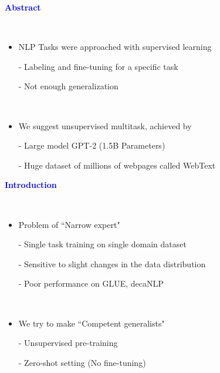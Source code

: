 \documentclass[professionalfont]{beamer}
\begin{document}
\frame{\titlepage}

\begin{frame}
\begin{center}
    { \textbf{\textcolor{blue}{ {\fontsize{12}{14}\selectfont Abstract} }} }
\end{center}
\\[0.5cm]

{\fontsize{10}{14}\selectfont 
\begin{itemize}
    \item NLP Tasks were approached with supervised learning
    
    - Labeling and fine-tuning for a specific task
    
    - Not enough generalization

    \\[0.5cm]

    \item We suggest unsupervised multitask, achieved by

    - Large model GPT-2 (1.5B Parameters)

    - Huge dataset of millions of webpages called WebText
\end{itemize}
}

\end{frame}

\begin{frame}
\begin{center}
    { \textbf{\textcolor{blue}{ {\fontsize{12}{14}\selectfont Introduction} }} }
\end{center}
\\[0.5cm]

{\fontsize{10}{14}\selectfont 
\begin{itemize}
    \item Problem of ``Narrow expert"
    
    - Single task training on single domain dataset
    
    - Sensitive to slight changes in the data distribution

    - Poor performance on GLUE, decaNLP

    \\[0.5cm]

    \item We try to make ``Competent generalists"

    - Unsupervised pre-training

    - Zero-shot setting (No fine-tuning)
\end{itemize}
}

\end{frame}
\end{document}
